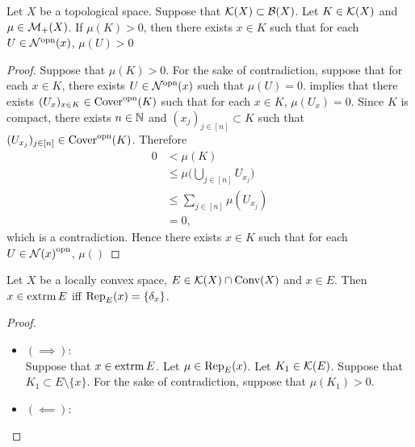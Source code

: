\documentclass{book}
\begin{document}
	\begin{ex} 
		Let $X$ be a topological space. Suppose that $\mathcal{K}(X) \subset \mathcal{B}(X)$. Let $K \in \mathcal{K}(X)$ and $\mu \in \mathcal{M}_+(X)$. If $\mu(K) > 0$, then there exists $x \in K$ such that for each $U \in {\mathcal{N}}^{\text{opn}}(x)$, $\mu(U) > 0$ 
	\end{ex}
	
	\begin{proof}
		Suppose that $\mu(K) > 0$. For the sake of contradiction, suppose that for each $x \in K$, there exists $U \in {\mathcal{N}}^{\text{opn}}(x)$ such that $\mu(U) = 0$.  implies that there exists $(U_x)_{x \in K} \in {\text{Cover}}^{\text{opn}}(K)$ such that for each $x \in K$, $\mu(U_x) = 0$. Since $K$ is compact, there exists $n \in \mathbb{N}$ and $(x_j)_{j \in [n]} \subset K$ such that $(U_{x_j})_{j \in [n]} \in {\text{Cover}}^{\text{opn}}(K)$. Therefore
		\begin{align*}
			0 
			& < \mu(K) \\
			& \leq \mu \bigg( \bigcup\limits_{j \in [n]} U_{x_j} \bigg) \\
			& \leq \sum\limits_{j \in [n]} \mu(U_{x_j}) \\
			& = 0,
		\end{align*}
		which is a contradiction. Hence there exists $x \in K$ such that for each $U \in {\mathcal{N}(x)}^{\text{opn}}$, $\mu()$
	\end{proof}
	
	\begin{ex}
		Let $X$ be a locally convex space, $E \in \mathcal{K}(X) \cap \text{Conv}(X)$ and $x \in E$. Then $x \in \operatorname{extrm} E$ iff $\operatorname{\text{Rep}}_E(x) = \{\delta_x\}$. 
	\end{ex}
	
	\begin{proof}\
		\begin{itemize}
			\item $(\implies)$: \\
			Suppose that $x \in \operatorname{extrm} E$. Let $\mu \in \operatorname{\text{Rep}}_E(x)$. Let $K_1 \in \mathcal{K}(E)$. Suppose that $K_1 \subset E \setminus \{x\}$. For the sake of contradiction, suppose that $\mu(K_1) > 0$.  
			\item $(\impliedby)$: \\
		\end{itemize}
	\end{proof}
	
	
	
	
	
	
	
	
	
	
	
\end{document}
